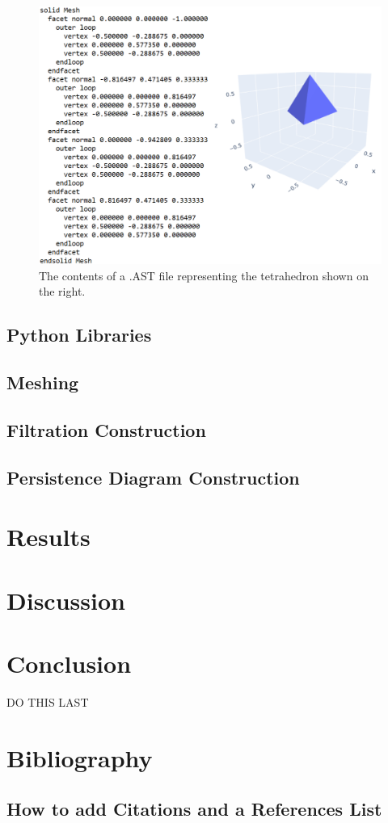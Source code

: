 \documentclass{article}
\begin{document}
\begin{figure}[H]
    \centering
    \includegraphics[width=0.5\linewidth]{tetrahedron_ast_code_plot.png}
    \caption{The contents of a .AST file representing the tetrahedron shown on the right.}
    \label{fig:ast_code}
\end{figure}

\subsection{Python Libraries}

\subsection{Meshing}

\subsection{Filtration Construction}

\subsection{Persistence Diagram Construction}

\section{Results}

\section{Discussion}

\section{Conclusion}
DO THIS LAST

\section{Bibliography}
\subsection{How to add Citations and a References List}



\end{document}
